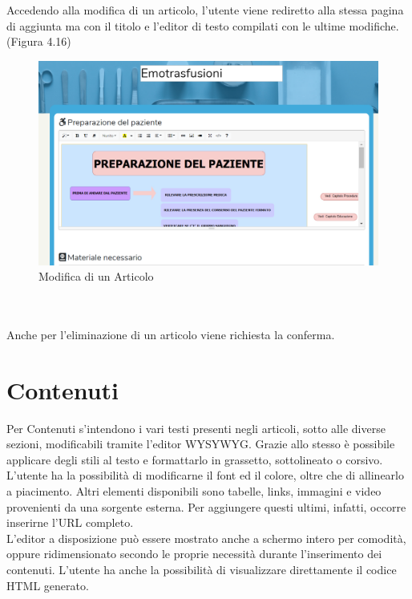 \documentclass[twoside]{supsistudent}
\begin{document}
\\\\
Accedendo alla modifica di un articolo, l'utente viene rediretto alla stessa pagina di aggiunta ma con il titolo e l'editor di testo compilati con le ultime modifiche. (Figura 4.16)\\
\begin{figure}[!h]
\centering
\includegraphics[scale=0.4]{saniwiki_modificaarticolo.png}
\caption{Modifica di un Articolo}
\end{figure}
\\\\
Anche per l'eliminazione di un articolo viene richiesta la conferma.

\section{Contenuti}
Per Contenuti s'intendono i vari testi presenti negli articoli, sotto alle diverse sezioni, modificabili tramite l'editor WYSYWYG. Grazie allo stesso è possibile applicare degli stili al testo e formattarlo in grassetto, sottolineato o corsivo. L'utente ha la possibilità di modificarne il font ed il colore, oltre che di allinearlo a piacimento. Altri elementi disponibili sono tabelle, links, immagini e video provenienti da una sorgente esterna. Per aggiungere questi ultimi, infatti, occorre inserirne l'URL completo.\\
L'editor a disposizione può essere mostrato anche a schermo intero per comodità, oppure ridimensionato secondo le proprie necessità durante l'inserimento dei contenuti. L'utente ha anche la possibilità di visualizzare direttamente il codice HTML generato.
\end{document}
